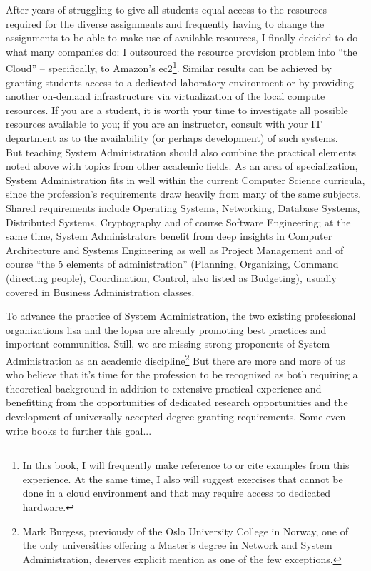 After years of struggling to give all students equal
access to the resources required for the diverse
assignments and frequently having to change the
assignments to be able to make use of available
resources, I finally decided to do what many companies
do: I outsourced the resource provision problem into
``the Cloud'' -- specifically, to Amazon's
\gls{ec2}\footnote{In
this book, I will frequently make reference to or cite
examples from this experience.  At the same time, I
also will suggest exercises that cannot be done in a
cloud environment and that may require access to
dedicated hardware.}.\cite{intro:login-teaching-sa}
Similar results can be achieved by granting students
access to a dedicated laboratory environment or by
providing another on-demand infrastructure via
virtualization of the local compute resources.  If you
are a student, it is worth your time to investigate
all possible resources available to you; if you are an
instructor, consult with your IT department as to the
availability (or perhaps development) of such systems.
\\

But teaching System Administration should also combine
the practical elements noted above with topics from
other academic fields.  As an area of specialization,
System Administration fits in well within the current
Computer Science curricula, since the profession's
requirements draw heavily from many of the same
subjects.  Shared requirements include Operating
Systems, Networking, Database Systems, Distributed
Systems, Cryptography and of course Software
Engineering; at the same time, System Administrators
benefit from deep insights in Computer Architecture
and Systems Engineering as well as Project Management
and of course ``the 5 elements of administration''
(Planning, Organizing, Command (directing people),
Coordination, Control, also listed as
Budgeting)\cite{intro:wiki-fayolism}, usually covered
in Business Administration classes.

To advance the practice of System Administration, the
two existing professional organizations \gls{lisa} and
the \gls{lopsa} are already promoting best practices
and important communities.  Still, we are missing
strong proponents of System Administration as an
academic discipline\footnote{Mark Burgess, previously
of the Oslo University College in Norway, one of the
only universities offering a Master's degree in
Network and System Administration, deserves explicit
mention as one of the few exceptions.} But there are
more and more of us who believe that it's time for the
profession to be recognized as both requiring a
theoretical background in addition to extensive
practical experience and benefitting from the
opportunities of dedicated research opportunities and
the development of universally accepted degree
granting requirements.  Some even write books to
further this goal...


